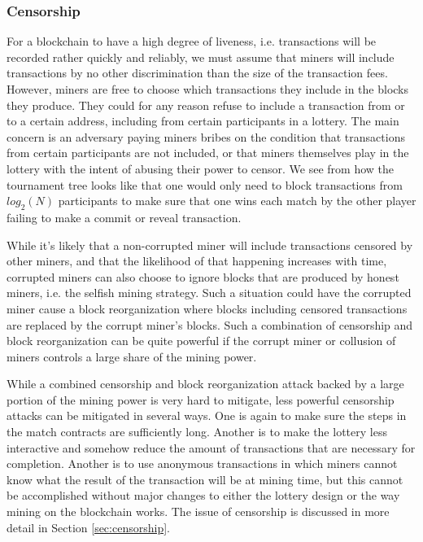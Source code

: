 \subsubsection{Censorship}
For a blockchain to have a high degree of liveness, i.e. transactions will be recorded rather quickly and reliably, we must assume that miners will include transactions by no other discrimination than the size of the transaction fees. However, miners are free to choose which transactions they include in the blocks they produce. They could for any reason refuse to include a transaction from or to a certain address, including from certain participants in a lottery. The main concern is an adversary paying miners bribes on the condition that transactions from certain participants are not included, or that miners themselves play in the lottery with the intent of abusing their power to censor. We see from how the tournament tree looks like that one would only need to block transactions from $log_2(N)$ participants to make sure that one wins each match by the other player failing to make a commit or reveal transaction. 

While it's likely that a non-corrupted miner will include transactions censored by other miners, and that the likelihood of that happening increases with time, corrupted miners can also choose to ignore blocks that are produced by honest miners, i.e. the selfish mining strategy. Such a situation could have the corrupted miner cause a block reorganization where blocks including censored transactions are replaced by the corrupt miner's blocks. Such a combination of censorship and block reorganization can be quite powerful if the corrupt miner or collusion of miners controls a large share of the mining power.

While a combined censorship and block reorganization attack backed by a large portion of the mining power is very hard to mitigate, less powerful censorship attacks can be mitigated in several ways. One is again to make sure the steps in the match contracts are sufficiently long. Another is to make the lottery less interactive and somehow reduce the amount of transactions that are necessary for completion. Another is to use anonymous transactions in which miners cannot know what the result of the transaction will be at mining time, but this cannot be accomplished without major changes to either the lottery design or the way mining on the blockchain works. The issue of censorship is discussed in more detail in Section \ref{sec:censorship}.

